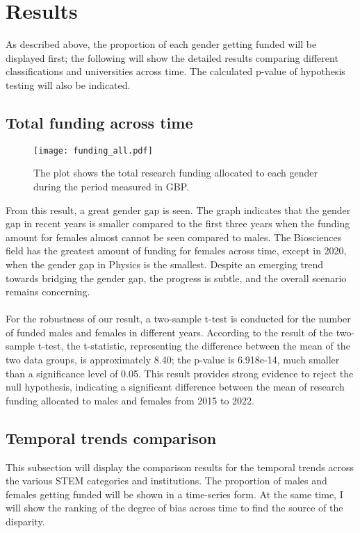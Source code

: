 \section{Results}

As described above, the proportion of each gender getting funded will be displayed first; the following will show the detailed results comparing different classifications and universities across time. The calculated p-value of hypothesis testing will also be indicated.

\subsection{Total funding across time}

\begin{figure}[H]
    \centering
    \texttt{[image: funding\_all.pdf]}
    \caption{The plot shows the total research funding allocated to each gender during the period measured in GBP.}
\end{figure}

From this result, a great gender gap is seen. The graph indicates that the gender gap in recent years is smaller compared to the first three years when the funding amount for females almost cannot be seen compared to males. The Biosciences field has the greatest amount of funding for females across time, except in 2020, when the gender gap in Physics is the smallest. Despite an emerging trend towards bridging the gender gap, the progress is subtle, and the overall scenario remains concerning.\\
\\
\noindent For the robustness of our result, a two-sample t-test is conducted for the number of funded males and females in different years. According to the result of the two-sample t-test, the t-statistic, representing the difference between the mean of the two data groups, is approximately 8.40; the p-value is 6.918e-14, much smaller than a significance level of 0.05. This result provides strong evidence to reject the null hypothesis, indicating a significant difference between the mean of research funding allocated to males and females from 2015 to 2022.

\subsection{Temporal trends comparison}

This subsection will display the comparison results for the temporal trends across the various STEM categories and institutions. The proportion of males and females getting funded will be shown in a time-series form. At the same time, I will show the ranking of the degree of bias across time to find the source of the disparity.

